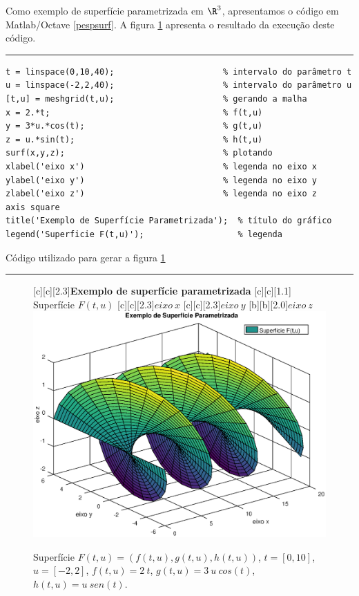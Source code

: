   Como exemplo de superfície parametrizada em $\R^3$, apresentamos o código em Matlab/Octave \ref{pespsurf}. A figura \ref{fig.pespsurf} apresenta o resultado da execução deste código.

\begin{Codigo}[htpb]
\noindent\rule{13cm}{1.pt}
\begin{verbatim}
t = linspace(0,10,40);                      % intervalo do parâmetro t 
u = linspace(-2,2,40);                      % intervalo do parâmetro u
[t,u] = meshgrid(t,u);                      % gerando a malha
x = 2.*t;                                   % f(t,u)
y = 3*u.*cos(t);                            % g(t,u)
z = u.*sin(t);                              % h(t,u)
surf(x,y,z);                                % plotando
xlabel('eixo x')                            % legenda no eixo x
ylabel('eixo y')                            % legenda no eixo y
zlabel('eixo z')                            % legenda no eixo z
axis square
title('Exemplo de Superfície Parametrizada');  % título do gráfico 
legend('Superficie F(t,u)');                   % legenda
\end{verbatim}
\vspace{-0.5cm}
\caption{Código utilizado para gerar a figura \ref{fig.pespsurf} } 
\noindent\rule{13cm}{1.pt}
\label{pespsurf}
\end{Codigo}

\begin{figure}[htpb]
\begin{center} 
[c][c][2.3]{\textbf{Exemplo de superfície parametrizada}}
[c][c][1.1]{\hspace{0.25cm} Superfície  $F(t,u)$}
[c][c][2.3]{$eixo \ x$}
[c][c][2.3]{$eixo \ y$}
[b][b][2.0]{$eixo \ z$}
\includegraphics*[angle=0,scale=0.5]{imagens/cap2/pespsurf.eps} 
\caption{Superfície $F(t,u) = (f(t,u), g(t,u), h(t,u))$, $t=[0,10]$, $u=[-2,2]$, $f(t,u)=2\ t$, $g(t,u)=3\ u\ cos(t)$, $h(t,u)=u\ sen(t)$.} 
\label{fig.pespsurf}
\end{center}
\end{figure}

